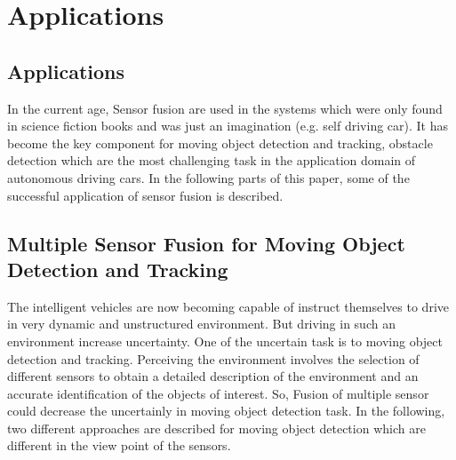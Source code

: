 \chapter{Applications}

\section{Applications}
In the current age, Sensor fusion are used in the systems which were only found in science fiction books and was just an imagination (e.g. self driving car). It has become the key component for moving object detection and tracking\cite{Cho_2014, Chavez_Garcia_2016}, obstacle detection\cite{Shinzato_2014} which are the most challenging task in the application domain of autonomous driving cars. In the following parts of this paper, some of the successful application of sensor fusion is described.


\section{Multiple Sensor Fusion for Moving Object Detection and Tracking}
The intelligent vehicles are now becoming capable of instruct themselves to drive in very dynamic and unstructured environment. But driving in such an environment increase uncertainty. One of the uncertain task is to moving object detection and tracking. Perceiving the environment involves the selection of different sensors to obtain a detailed description of the environment and an accurate identification of the objects of interest\cite{Chavez_Garcia_2016}. So, Fusion of multiple sensor could decrease the uncertainly in moving object detection task. In the following, two different approaches are described for moving object detection which are different in the view point of the sensors.

